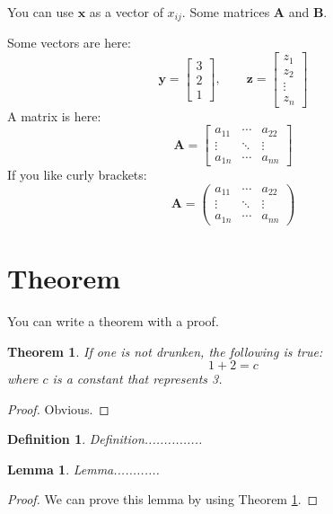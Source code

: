 \documentclass[letterpaper, 11pt]{article}
\newtheorem{theorem}{Theorem}
\newtheorem{lemma}{Lemma}
\newtheorem{definition}{Definition}
\renewcommand{\vec}[1]{\bm{#1}}
\newcommand{\mat}[1]{\bm{#1}}
\begin{document}
You can use $\vec{x}$ as a vector of $x_{ij}$. Some matrices $\mat{A}$ and $\mat{B}$.

Some vectors are here:
\[
	\vec{y} = \begin{bmatrix} 3 \\ 2 \\ 1 \end{bmatrix}, \qquad
	\vec{z} = \begin{bmatrix} z_1 \\ z_2 \\ \vdots \\ z_n \end{bmatrix}
\]
A matrix is here:
\[
	\mat{A} = \begin{bmatrix} a_{11} & \cdots & a_{22}  \\
							  \vdots & \ddots & \vdots  \\
							  a_{1n} & \cdots & a_{nn}  \end{bmatrix}
\]
If you like curly brackets:
\[
	\mat{A} = \begin{pmatrix} a_{11} & \cdots & a_{22}  \\
							  \vdots & \ddots & \vdots  \\
							  a_{1n} & \cdots & a_{nn}  \end{pmatrix}
\]



\section{Theorem}

You can write a theorem with a proof.

\begin{theorem} \label{thm:fundamental}
If one is not drunken, the following is true:
\begin{equation}
	1 + 2 = c
\end{equation}
where $c$ is a constant that represents 3.
\end{theorem}
\begin{proof}
Obvious.
\end{proof}

\begin{definition}
Definition...............
\end{definition}

\begin{lemma}
Lemma............
\end{lemma}
\begin{proof}
We can prove this lemma by using Theorem \ref{thm:fundamental}.
\end{proof}
\end{document}
